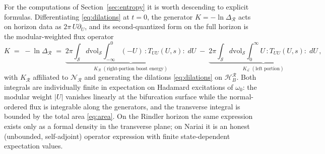 \documentclass[11pt]{article}
\newcommand{\Nariai}{Nariai}
\begin{document}
For the computations of Section~\ref{sec:entropy} it is worth descending to explicit formulas. Differentiating \eqref{eq:dilations} at $t=0$, the generator $K = -\ln \Delta_{\mathcal{R}}$ acts on horizon data as $2\pi\, U \partial_U$, and its second-quantized form on the full horizon is the modular-weighted flux operator
\begin{equation}
K \;=\; -\ln \Delta_{\mathcal{R}}
\;=\; \underbrace{2\pi \int_{\mathcal{S}} d\mathrm{vol}_{\mathcal{S}} \int_{-\infty}^{0} (-U)\, {:}T_{UU}(U,s){:}\; dU}_{\displaystyle K_{\mathcal{R}}\;(\text{right-portion boost energy})}
\;-\;
\underbrace{2\pi \int_{\mathcal{S}} d\mathrm{vol}_{\mathcal{S}} \int_{0}^{\infty} U\, {:}T_{UU}(U,s){:}\; dU}_{\displaystyle K_{\mathcal{L}}\;(\text{left portion})}\,,
\label{eq:modularH}
\end{equation}
with $K_{\mathcal{R}}$ affiliated to $\mathscr{N}_{\mathcal{R}}$ and generating the dilations \eqref{eq:dilations} on $\mathcal{H}_B^{\mathcal{R}}$. Both integrals are individually finite in expectation on Hadamard excitations of $\omega_0$: the modular weight $|U|$ vanishes linearly at the bifurcation surface while the normal-ordered flux is integrable along the generators, and the transverse integral is bounded by the total area \eqref{eq:area}. On the Rindler horizon the same expression exists only as a formal density in the transverse plane; on \Nariai{} it is an honest (unbounded, self-adjoint) operator expression with finite state-dependent expectation values.
\end{document}
